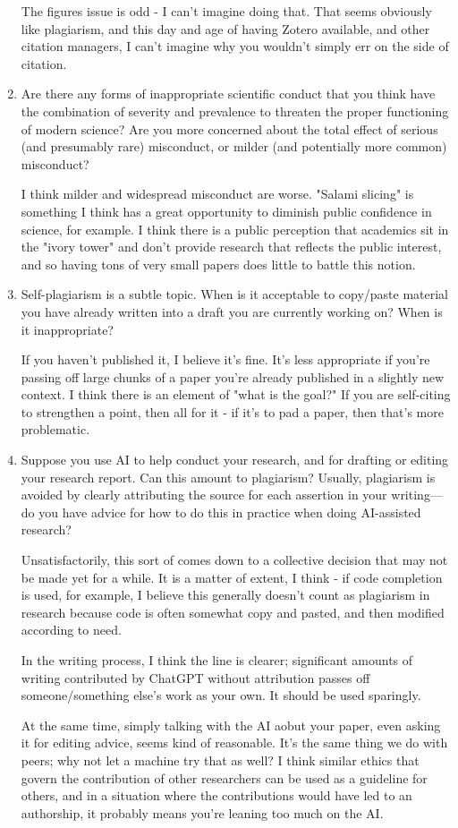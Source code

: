 \documentclass[12pt]{article}
\begin{document}
\begin{enumerate}
The figures issue is odd - I can't imagine doing that. That seems obviously
like plagiarism, and this day and age of having Zotero available, and
other citation managers, I can't imagine why you wouldn't simply err on the
side of citation.

\item Are there any forms of inappropriate scientific conduct that you think have the combination of severity and prevalence to threaten the proper functioning of modern science? Are you more concerned about the total effect of serious (and presumably rare) misconduct, or milder (and potentially more common) misconduct?

I think milder and widespread misconduct are worse. "Salami slicing" is 
something I think has a great opportunity to diminish public confidence
in science, for example. I think there is a public perception that
academics sit in the "ivory tower" and don't provide research that 
reflects the public interest, and so having tons of very small papers 
does little to battle this notion.

\item Self-plagiarism is a subtle topic. When is it acceptable to copy/paste material you have already written into a draft you are currently working on? When is it inappropriate?

If you haven't published it, I believe it's fine. It's less appropriate if you're passing off large chunks of a paper you're already published in a slightly new context. I think there is an element of "what is the goal?" If 
you are self-citing to strengthen a point, then all for it - if it's to
pad a paper, then that's more problematic.

\item Suppose you use AI to help conduct your research, and for drafting or editing your research report. Can this amount to plagiarism? Usually, plagiarism is avoided by clearly attributing the source for each assertion in your writing---do you have advice for how to do this in practice when doing AI-assisted research?

Unsatisfactorily, this sort of comes down to a collective decision that 
may not be made yet for a while. It is a matter of extent, I think - if
code completion is used, for example, I believe this generally doesn't
count as plagiarism in research because code is often somewhat copy
and pasted, and then modified according to need. 

In the writing process, I think the line is clearer; significant amounts
of writing contributed by ChatGPT without attribution passes off someone/something else's work as your own. It should be used sparingly.

At the same time, simply talking with the AI aobut your paper, even asking it for editing advice, seems kind of reasonable. It's the same thing we
do with peers; why not let a machine try that as well? I think similar ethics that govern the contribution of other researchers can be used
as a guideline for others, and in a situation where the contributions
would have led to an authorship, it probably means you're leaning too much on the AI.

\end{enumerate}
\end{document}
